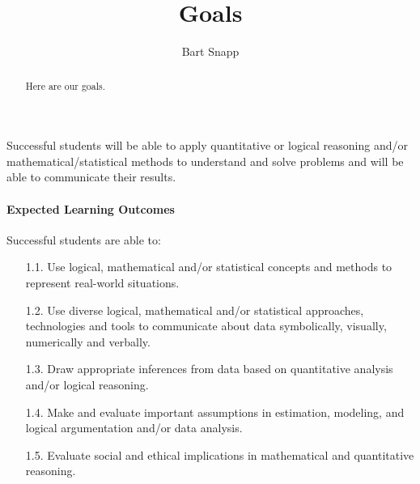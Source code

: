\documentclass{ximera}
\author{Bart Snapp}
\title{Goals}
\begin{document}
\begin{abstract}
Here are our goals.
\end{abstract}
\maketitle

Successful students will be able to apply quantitative or logical reasoning
and/or mathematical/statistical methods to understand and solve problems and
will be able to communicate their results.

\paragraph{Expected Learning Outcomes}

Successful students are able to:
\begin{enumerate}
  \item[1.1.] Use logical, mathematical and/or statistical concepts and methods
    to
    represent real-world situations.
  \item[1.2.] Use diverse logical, mathematical and/or statistical approaches,
    technologies and tools to communicate about data symbolically, visually,
    numerically and verbally.
  \item[1.3.] Draw appropriate inferences from data based on quantitative
    analysis
    and/or
    logical reasoning.
  \item[1.4.] Make and evaluate important assumptions in estimation, modeling,
    and
    logical argumentation and/or data analysis.
  \item[1.5.] Evaluate social and ethical implications in mathematical and
    quantitative
    reasoning.
\end{enumerate}
\end{document}
